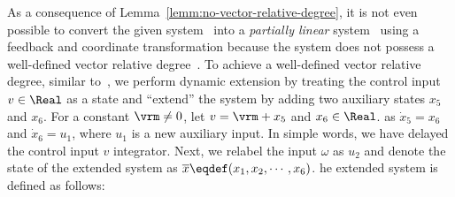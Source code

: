 As a consequence of Lemma~\ref{lemm:no-vector-relative-degree}, it is not even possible to convert the given system~\mynne{\eqref{eq:car_robot}} into a \textit{partially linear} system~ using a feedback and coordinate transformation because the system does not possess a well-defined vector relative degree~\cite{Isi95}. 
To achieve a well-defined vector relative degree, similar to~\cite{AkhNieWas2015,AkhNie2011}, we perform dynamic extension by treating the control input $v\in\Real$ as a state and ``extend'' the system by adding two auxiliary states $x_5$ and $x_6$. 
For a constant $\vrm \neq 0$, let  $v = \vrm + x_5$
and $x_6 \in\Real$.  as $\dot x_5 = x_6$ and $\dot{x}_6 = u_1$, where
$u_1$ is a new auxiliary input. In simple words, we have delayed the control input $v$  integrator. Next, we relabel the input $\omega$ as $u_2$ and denote the state of the extended system as $\agx\eqdef (x_1, x_{2}, \cdots,x_6)$. he extended system is defined as follows:
%
%
